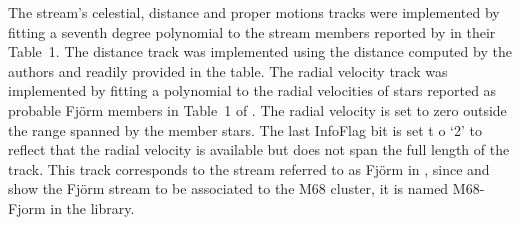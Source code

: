 The stream's celestial, distance and proper motions tracks were implemented by fitting a seventh degree polynomial to the stream members reported by \citet{Ibata2021} in their Table~1. The distance track was implemented using the distance computed by the authors and readily provided in the table. 
 The radial velocity track was implemented by fitting a polynomial to the radial velocities of stars reported as probable Fj\"orm members in Table~1 of \citet{Ibata2019}. The radial velocity is set to zero outside the range spanned by the member stars. The last InfoFlag bit is set t
o `2' to reflect that the radial velocity is available but does not span the full length of the track.
This track corresponds to the stream referred to as Fj\"orm in \citet{Ibata2019,Ibata2021}, since \citet{Ibata2021} and \citet{Palau2019} show the Fj\"orm stream to be associated to the M68 cluster, it is named M68-Fjorm in the library.
